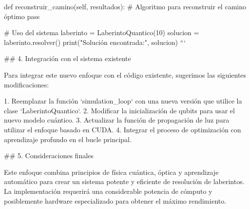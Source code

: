     def reconstruir_camino(self, resultados):
        # Algoritmo para reconstruir el camino óptimo
        pass

# Uso del sistema
laberinto = LaberintoQuantico(10)
solucion = laberinto.resolver()
print("Solución encontrada:", solucion)
```

## 4. Integración con el sistema existente

Para integrar este nuevo enfoque con el código existente, sugerimos las siguientes modificaciones:

1. Reemplazar la función `simulation_loop` con una nueva versión que utilice la clase `LaberintoQuantico`.
2. Modificar la inicialización de qubits para usar el nuevo modelo cuántico.
3. Actualizar la función de propagación de luz para utilizar el enfoque basado en CUDA.
4. Integrar el proceso de optimización con aprendizaje profundo en el bucle principal.

## 5. Consideraciones finales

Este enfoque combina principios de física cuántica, óptica y aprendizaje automático para crear un sistema potente y eficiente de resolución de laberintos. La implementación requerirá una considerable potencia de cómputo y posiblemente hardware especializado para obtener el máximo rendimiento.